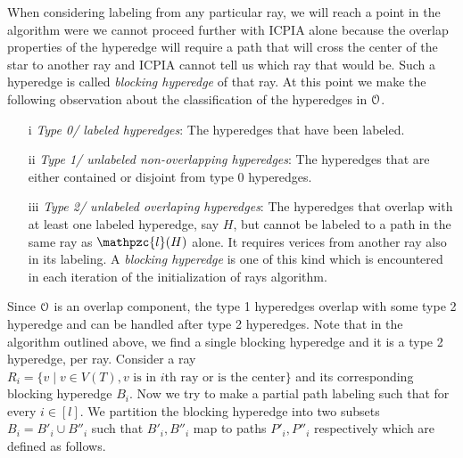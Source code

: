 \documentclass[a4paper,UKenglish,numberwithinsect]{lipics}
\def\cO{{\cal O}}
\def\cl{\mathpzc{l}}
\begin{document}
\noindent
When considering labeling from any
particular ray, we will reach a point in the algorithm were we cannot
proceed further with ICPIA alone because the overlap properties of the
hyperedge will require a path that will cross the center of the star
to another ray and ICPIA cannot tell us which ray that would be. Such
a hyperedge is called {\em blocking hyperedge} of that ray. At this
point we make the following observation about the classification of
the hyperedges in $\cO$.
\begin{itemize}
\item[i] {\em Type 0/ labeled hyperedges}: The hyperedges that have been labeled.
\item[ii] {\em Type 1/ unlabeled non-overlapping hyperedges}: The hyperedges that are either contained or
  disjoint from type 0 hyperedges.
\item[iii] {\em Type 2/ unlabeled overlaping hyperedges}: The hyperedges that overlap with at least one
  labeled hyperedge, say $H$, but cannot be labeled to a path in the
  same ray as $\cl(H)$ alone. It requires verices from another ray
  also in its labeling. A {\em blocking hyperedge} is one of this kind
  which is encountered in each iteration of the initialization of rays algorithm.
\end{itemize}
\noindent
Since $\cO$ is an overlap component, the type 1 hyperedges overlap
with some type 2 hyperedge and can be handled after type 2
hyperedges. Note that in the algorithm outlined above, we find a single
blocking hyperedge and it is a type 2 hyperedge, per ray. Consider a
ray $R_i = \{v \mid v \in V(T), v \text{ is in $i$th ray or is the center}\}$ and its
corresponding blocking hyperedge $B_i$. Now we try
to make a partial path labeling such that for every $i \in [l]$. We partition the blocking
hyperedge into two subsets $B_i = B'_i \cup B''_i$ such that $B'_i,
B''_i$ map to paths $P'_i, P''_i$ respectively which are defined as
follows. 
\end{document}
